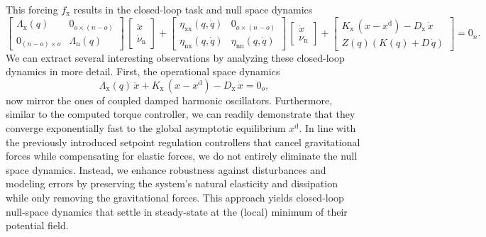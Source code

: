 This forcing $f_\mathrm{x}$ results in the closed-loop task and null space dynamics
\begin{equation}
    \begin{bmatrix}
        \Lambda_\mathrm{x}(q) & 0_{o \times (n-o)}\\
        0_{(n-o) \times o} & \Lambda_\mathrm{n}(q)
    \end{bmatrix} \, \begin{bmatrix}
        \ddot{x}\\
        \dot{\nu}_\mathrm{n}
    \end{bmatrix} + \begin{bmatrix}
        \eta_\mathrm{xx}(q,\dot{q}) & 0_{o \times (n-o)}\\
        \eta_\mathrm{nx}(q,\dot{q}) & \eta_\mathrm{nn}(q,\dot{q})
    \end{bmatrix} \, \begin{bmatrix}
        \dot{x}\\ \nu_\mathrm{n}
    \end{bmatrix} + \begin{bmatrix}
        K_\mathrm{x} \, (x - x^\mathrm{d}) - D_\mathrm{x} \, \dot{x}\\
        Z(q) \left ( K(q) + D \, \dot{q} \right )
    \end{bmatrix} = 0_{n}.
\end{equation}
We can extract several interesting observations by analyzing these closed-loop dynamics in more detail. First, the operational space dynamics
\begin{equation}
    \Lambda_\mathrm{x}(q) \, \ddot{x} + K_\mathrm{x} \, (x - x^\mathrm{d}) - D_\mathrm{x} \, \dot{x} = 0_{o},
\end{equation}
now mirror the ones of coupled damped harmonic oscillators.
Furthermore, similar to the computed torque controller, we can readily demonstrate that they converge exponentially fast to the global asymptotic equilibrium $x^\mathrm{d}$. In line with the previously introduced setpoint regulation controllers that cancel gravitational forces while compensating for elastic forces, we do not entirely eliminate the null space dynamics. Instead, we enhance robustness against disturbances and modeling errors by preserving the system’s natural elasticity and dissipation while only removing the gravitational forces. This approach yields closed-loop null-space dynamics that settle in steady-state at the (local) minimum of their potential field.

